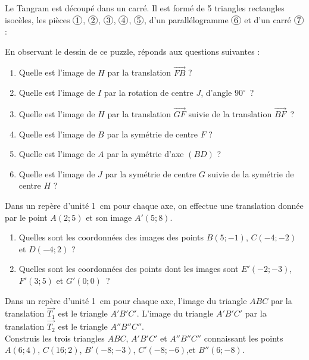 \begin{exercice}[Tangram]
Le Tangram est découpé dans un carré. Il est formé de 5 triangles rectangles isocèles, les pièces $\circled{1}$, $\circled{2}$, $\circled{3}$, $\circled{4}$, $\circled{5}$, d'un parallélogramme $\circled{6}$ et d'un carré $\circled{7}$ :

En observant le dessin de ce puzzle, réponds aux questions suivantes :
\begin{enumerate}
 \item Quelle est l'image de $H$ par la translation $\overrightarrow{FB}$ ?
 \item Quelle est l'image de $I$ par la rotation de centre $J$, d'angle $90^\circ$ ?
 \item Quelle est l'image de $H$ par la translation $\overrightarrow{GF}$ suivie de la translation $\overrightarrow{BF}$ ?
 \item Quelle est l'image de $B$ par la symétrie de centre $F$ ?
 \item Quelle est l'image de $A$ par la symétrie d'axe $(BD)$ ?
 \item Quelle est l'image de $J$ par la symétrie de centre $G$ suivie de la symétrie de centre $H$ ?
 \end{enumerate}
\end{exercice}


\begin{exercice}[En repérage]
Dans un repère d'unité 1 cm pour chaque axe, on effectue une translation donnée par le point $A(2 ; 5)$ et son image $A'(5 ; 8)$.
\begin{enumerate}
 \item Quelles sont les coordonnées des images des points $B(5 ; - 1)$, $C(- 4 ; - 2)$ et $D(- 4 ; 2)$ ?
 \item Quelles sont les coordonnées des points dont les images sont $E'(- 2 ; - 3)$, $F'(3 ; 5)$ et $G'(0 ; 0)$ ?
 \end{enumerate}
\end{exercice}


\begin{exercice}
Dans un repère d'unité 1 cm pour chaque axe, l'image du triangle $ABC$ par la translation $\vec{T_1}$ est le triangle $A'B'C'$. L'image du triangle $A'B'C'$ par la translation $\vec{T_2}$ est le triangle $A''B''C''$. \\[0.5em]
Construis les trois triangles $ABC$, $A'B'C'$ et $A''B''C''$ connaissant les points $A(6 ; 4)$, $C(16 ; 2)$, $B'(- 8 ; - 3)$, $C'(- 8 ; - 6)$,et $B''(6 ; - 8)$.
\end{exercice}


